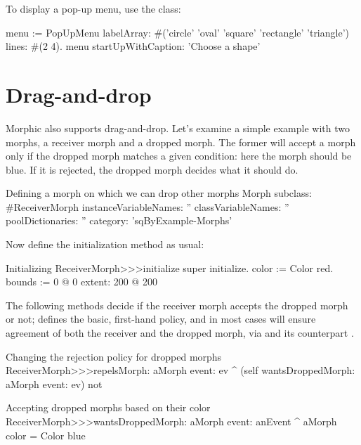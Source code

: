 \documentclass[a4paper,10pt,twoside]{book}
\begin{document}

To display a pop-up menu, use the  class:
\begin{code}{}
menu := PopUpMenu
   labelArray: #('circle' 'oval' 'square' 'rectangle' 'triangle')
   lines: #(2 4).
menu startUpWithCaption: 'Choose a shape'
\end{code}


\section{Drag-and-drop}

Morphic also supports drag-and-drop. Let's examine a simple example with two morphs, a receiver morph and a dropped morph. The former will accept a morph only if the dropped morph matches a given condition: here the morph should be blue. If it is rejected, the dropped morph decides what it should do.

\begin{classdef}{Defining a morph on which we can drop other morphs}
Morph subclass: #ReceiverMorph
   instanceVariableNames: ''
   classVariableNames: ''
   poolDictionaries: ''
   category: 'sqByExample-Morphs'
\end{classdef}

Now define the initialization method as usual:
\begin{method}{Initializing }
ReceiverMorph>>>initialize
   super initialize.
   color := Color red.
   bounds := 0 @ 0 extent: 200 @ 200
\end{method}

The following methods decide if the receiver morph accepts the dropped morph or not;  defines the basic, first-hand policy, and in most cases will ensure agreement of both the receiver and the dropped morph, via  and its counterpart .
\begin{method}{Changing the rejection policy for dropped morphs}
ReceiverMorph>>>repelsMorph: aMorph event: ev
   ^ (self wantsDroppedMorph: aMorph event: ev) not
\end{method}
\begin{method}{Accepting dropped morphs based on their color}
ReceiverMorph>>>wantsDroppedMorph: aMorph event: anEvent
   ^ aMorph color = Color blue
\end{method}
\end{document}
